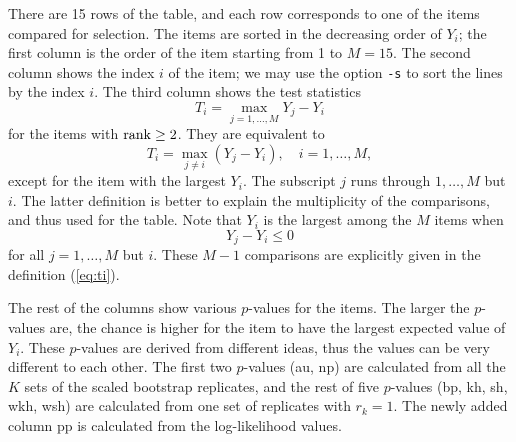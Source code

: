 \documentclass[12pt]{article}
\newcommand{\refeq}[1]{(\ref{eq:#1})}
\begin{document}
There are 15 rows of the table, and each row corresponds to one of the
items compared for selection. The items are sorted in the decreasing
order of $Y_i$; the first column is the order of the item starting from
1 to $M=15$.  The second column shows the index $i$ of the item; we may
use the option {\tt -s} to sort the lines by the index $i$.  The third
column shows the test statistics \[ T_i = \max_{j=1,\ldots,M} Y_j - Y_i
\] for the items with ${\rm rank} \ge 2$. They are equivalent to
\begin{equation}
 T_i = \max_{j\neq i} (Y_j - Y_i), \quad i=1,\ldots,M, \label{eq:ti}
\end{equation}
except for the item with the largest $Y_i$. The subscript $j$ runs
through $1,\ldots,M$ but $i$. The latter definition is better to explain
the multiplicity of the comparisons, and thus used for the table. Note
that $Y_i$ is the largest among the $M$ items when \[ Y_j - Y_i \le 0 \]
for all $j=1,\ldots,M$ but $i$. These $M-1$ comparisons are explicitly
given in the definition \refeq{ti}.

The rest of the columns show various $p$-values for the items.  The
larger the $p$-values are, the chance is higher for the item to have the
largest expected value of $Y_i$. These $p$-values are derived from
different ideas, thus the values can be very different to each other.
The first two $p$-values (au, np) are calculated from all the $K$ sets
of the scaled bootstrap replicates, and the rest of five $p$-values
(bp, kh, sh, wkh, wsh) are calculated from one set of replicates with
$r_k=1$. The newly added column pp is calculated from the log-likelihood
values.
\end{document}
